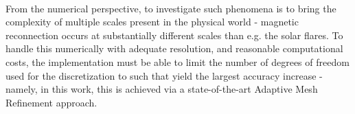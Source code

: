\paragraph{}
From the numerical perspective, to investigate such phenomena is to bring the complexity of multiple scales present in the physical world - magnetic reconnection occurs at substantially different scales than e.g. the solar flares. To handle this numerically with adequate resolution, and reasonable computational costs, the implementation must be able to limit the number of degrees of freedom used for the discretization to such that yield the largest accuracy increase - namely, in this work, this is achieved via a state-of-the-art Adaptive Mesh Refinement approach.
